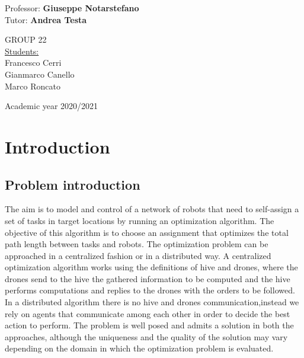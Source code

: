 \documentclass{article}
\def\blankpage{%
      \clearpage%
      \thispagestyle{empty}%
      \addtocounter{page}{-1}%
      \null%
      \clearpage}
\begin{document}
\begin{flushleft}                                                                              
     {\large Professor: \textbf{\@ Giuseppe Notarstefano}} \\  
     {\large Tutor: \textbf{\@ Andrea Testa}} \\
      \vspace{13mm}
\end{flushleft}
\begin{flushright}
      {\large  {GROUP 22}}\\
      {\large \underline {Students:}}\\
      {\large Francesco Cerri}\\
      {\large Gianmarco Canello}\\
      {\large Marco Roncato}\\
\end{flushright}        %
\begin{center}
\vfill
      {\large Academic year \@2020/2021} \\
\end{center}


\blankpage{}


\begin{center}

\thispagestyle{empty}
\Large\tableofcontents \thispagestyle{empty}
\newpage
\listoffigures\thispagestyle{empty} 

\end{center}




\newpage

\section{Introduction}
\subsection{Problem introduction}
The aim is to model and control of a network of robots that need to
self-assign a set of tasks in target locations by running an optimization algorithm. The objective of this algorithm is to choose an assignment that optimizes the total path length between tasks and robots. The optimization problem can be approached in a centralized fashion or in a distributed way.
A centralized optimization algorithm works using the definitions of hive and drones, where the drones send to the hive the gathered information to be computed and the hive performs computations and replies to the drones with the orders to be followed. In a distributed algorithm there is no hive and drones communication,instead we rely on agents that communicate among each other in order to decide the best action to perform.
The problem is well posed and admits a solution in both the approaches, although the uniqueness and the quality of the solution may vary depending on the domain in which the optimization problem is evaluated.
\end{document}
